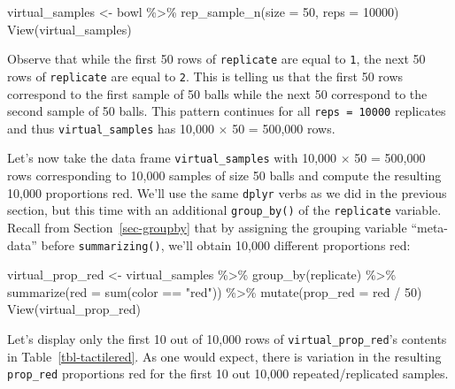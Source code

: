 \documentclass[
  letterpaper,
  DIV=11,
  numbers=noendperiod]{scrreprt}
\newenvironment{Shaded}{\begin{snugshade}}{\end{snugshade}}
\newcommand{\AttributeTok}[1]{\textcolor[rgb]{0.40,0.45,0.13}{#1}}
\newcommand{\DecValTok}[1]{\textcolor[rgb]{0.68,0.00,0.00}{#1}}
\newcommand{\FunctionTok}[1]{\textcolor[rgb]{0.28,0.35,0.67}{#1}}
\newcommand{\NormalTok}[1]{\textcolor[rgb]{0.00,0.23,0.31}{#1}}
\newcommand{\OtherTok}[1]{\textcolor[rgb]{0.00,0.23,0.31}{#1}}
\newcommand{\SpecialCharTok}[1]{\textcolor[rgb]{0.37,0.37,0.37}{#1}}
\newcommand{\StringTok}[1]{\textcolor[rgb]{0.13,0.47,0.30}{#1}}
\theoremstyle{definition}
\theoremstyle{remark}
\begin{document}
\begin{Shaded}
\begin{Highlighting}[]
\NormalTok{virtual\_samples }\OtherTok{\textless{}{-}}\NormalTok{ bowl }\SpecialCharTok{\%\textgreater{}\%} 
  \FunctionTok{rep\_sample\_n}\NormalTok{(}\AttributeTok{size =} \DecValTok{50}\NormalTok{, }\AttributeTok{reps =} \DecValTok{10000}\NormalTok{)}
\FunctionTok{View}\NormalTok{(virtual\_samples)}
\end{Highlighting}
\end{Shaded}

Observe that while the first 50 rows of \texttt{replicate} are equal to
\texttt{1}, the next 50 rows of \texttt{replicate} are equal to
\texttt{2}. This is telling us that the first 50 rows correspond to the
first sample of 50 balls while the next 50 correspond to the second
sample of 50 balls. This pattern continues for all
\texttt{reps\ =\ 10000} replicates and thus \texttt{virtual\_samples}
has 10,000 \(\times\) 50 = 500,000 rows.

Let's now take the data frame \texttt{virtual\_samples} with 10,000
\(\times\) 50 = 500,000 rows corresponding to 10,000 samples of size 50
balls and compute the resulting 10,000 proportions red. We'll use the
same \texttt{dplyr} verbs as we did in the previous section, but this
time with an additional \texttt{group\_by()} of the \texttt{replicate}
variable. Recall from Section~\ref{sec-groupby} that by assigning the
grouping variable ``meta-data'' before \texttt{summarizing()}, we'll
obtain 10,000 different proportions red:

\begin{Shaded}
\begin{Highlighting}[]
\NormalTok{virtual\_prop\_red }\OtherTok{\textless{}{-}}\NormalTok{ virtual\_samples }\SpecialCharTok{\%\textgreater{}\%} 
  \FunctionTok{group\_by}\NormalTok{(replicate) }\SpecialCharTok{\%\textgreater{}\%} 
  \FunctionTok{summarize}\NormalTok{(}\AttributeTok{red =} \FunctionTok{sum}\NormalTok{(color }\SpecialCharTok{==} \StringTok{"red"}\NormalTok{)) }\SpecialCharTok{\%\textgreater{}\%} 
  \FunctionTok{mutate}\NormalTok{(}\AttributeTok{prop\_red =}\NormalTok{ red }\SpecialCharTok{/} \DecValTok{50}\NormalTok{)}
\FunctionTok{View}\NormalTok{(virtual\_prop\_red)}
\end{Highlighting}
\end{Shaded}

Let's display only the first 10 out of 10,000 rows of
\texttt{virtual\_prop\_red}'s contents in Table~\ref{tbl-tactilered}. As
one would expect, there is variation in the resulting \texttt{prop\_red}
proportions red for the first 10 out 10,000 repeated/replicated samples.
\end{document}
